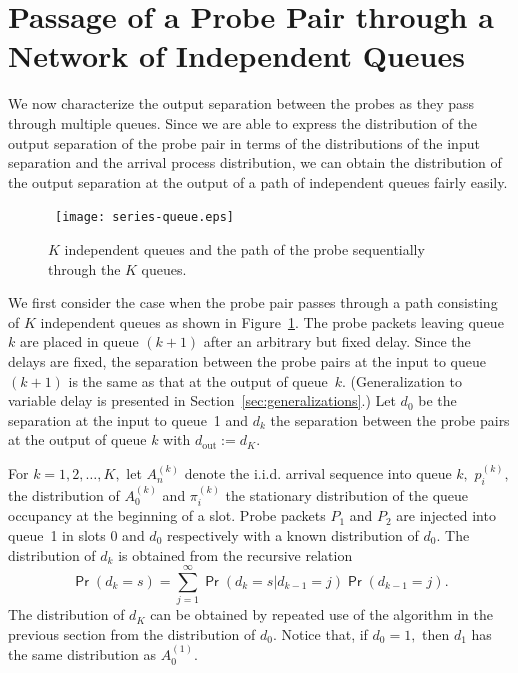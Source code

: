 \documentclass[11pt]{article}
\newcommand{\prob}[1]{\mathsf{\Pr}\left(#1\right)}
\begin{document}
\section{Passage of a Probe Pair through a Network of Independent
  Queues}
\label{sec:probe-pair-network}
We now characterize the output separation between the probes as they
pass through multiple queues.  Since we are able to express the
distribution of the output separation of the probe pair in terms of
the distributions of the input separation and the arrival process
distribution, we can obtain the distribution of the output separation
at the output of a path of independent queues fairly easily.

\begin{figure}
  \begin{center}
    \     
    \texttt{[image: series-queue.eps]}
  \end{center}
  \caption{$K$ independent queues and the path of the probe
    sequentially through the $K$ queues.}
    \label{fig:queue-series}
\end{figure}

We first consider the case when the probe pair passes through a path
consisting of $K$ independent queues as shown in
Figure~\ref{fig:queue-series}. The probe packets leaving queue~$k$ are
placed in queue $(k+1)$ after an arbitrary but fixed delay. Since the
delays are fixed, the separation between the probe pairs at the input
to queue~$(k+1)$ is the same as that at the output of queue~$k$.
(Generalization to variable delay is presented in
Section~\ref{sec:generalizations}.)  Let $d_0$ be the separation at
the input to queue~1 and $d_k$ the separation between the probe pairs
at the output of queue $k$ with $d_{\mathrm{out}}:=d_K.$

For $k=1, 2, \ldots, K,$ let $A_n^{(k)}$ denote the i.i.d.  arrival
sequence into queue $k,$ $p_i^{(k)},$ the distribution of $A_0^{(k)}$
and $\pi^{(k)}_i$ the stationary distribution of the queue occupancy
at the beginning of a slot.  Probe packets $P_1$ and $P_2$ are
injected into queue~1 in slots $0$ and $d_0$ respectively with a known
distribution of $d_0.$ The distribution of $d_k$ is obtained from the
recursive relation
\begin{equation}
  \prob{d_k=s} = \sum_{j=1}^\infty \prob{d_k=s |
    d_{k-1} =j} \prob{d_{k - 1} =j}. 
  \label{eq:d_k-distribution}
\end{equation}
The distribution of $d_K$ can be obtained by repeated use of the
algorithm in the previous section from the distribution of $d_0$.
Notice that, if $d_0=1,$ then $d_1$ has the same distribution as
$A^{(1)}_0.$
\end{document}
